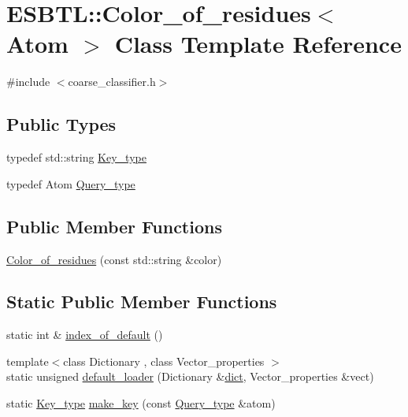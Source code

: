 \hypertarget{classESBTL_1_1Color__of__residues}{}\section{E\+S\+B\+TL\+:\+:Color\+\_\+of\+\_\+residues$<$ Atom $>$ Class Template Reference}
\label{classESBTL_1_1Color__of__residues}


{\ttfamily \#include $<$coarse\+\_\+classifier.\+h$>$}

\subsection*{Public Types}
\begin{DoxyCompactItemize}
\item 
typedef std\+::string \hyperlink{classESBTL_1_1Color__of__residues_a38d3b296b236f785e36b7aba5a370f53}{Key\+\_\+type}
\item 
typedef Atom \hyperlink{classESBTL_1_1Color__of__residues_a330e9e55bf0f4610807939a480d0024e}{Query\+\_\+type}
\end{DoxyCompactItemize}
\subsection*{Public Member Functions}
\begin{DoxyCompactItemize}
\item 
\hyperlink{classESBTL_1_1Color__of__residues_acaab1ef7aaa341b11c9efbb201c3e608}{Color\+\_\+of\+\_\+residues} (const std\+::string \&color)
\end{DoxyCompactItemize}
\subsection*{Static Public Member Functions}
\begin{DoxyCompactItemize}
\item 
static int \& \hyperlink{classESBTL_1_1Color__of__residues_a558c1d7709ddce95a82cc5d1a6901d7a}{index\+\_\+of\+\_\+default} ()
\item 
{\footnotesize template$<$class Dictionary , class Vector\+\_\+properties $>$ }\\static unsigned \hyperlink{classESBTL_1_1Color__of__residues_adff9a62be71f9c64cad94e2fff261523}{default\+\_\+loader} (Dictionary \&\hyperlink{Tsai__jmb__99__radii_8h_a3175002a2df717ae9e433cd2210fea97}{dict}, Vector\+\_\+properties \&vect)
\item 
static \hyperlink{classESBTL_1_1Color__of__residues_a38d3b296b236f785e36b7aba5a370f53}{Key\+\_\+type} \hyperlink{classESBTL_1_1Color__of__residues_a86da4fab2af81cbe9029e11b7b0376e3}{make\+\_\+key} (const \hyperlink{classESBTL_1_1Color__of__residues_a330e9e55bf0f4610807939a480d0024e}{Query\+\_\+type} \&atom)
\end{DoxyCompactItemize}


